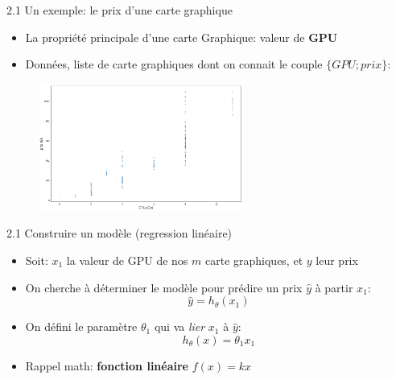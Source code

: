 \begin{frame}{2.1 Un exemple: le prix d'une carte graphique}
  \begin{itemize}
  \item La propriété principale d'une carte Graphique: valeur de \textbf{GPU}
    \vspace{0.2cm}
  \item Données, liste de carte graphiques dont on connait le couple $\{GPU;prix\}$:
  \end{itemize}

  \begin{figure}
    \includegraphics[width=0.6\textwidth]{fig/gpuPrices.png}    
  \end{figure}
\end{frame}

\begin{frame}{2.1 Construire un modèle (regression linéaire)}
  \begin{itemize}
  \item Soit: $x_{1}$ la valeur de GPU de nos $m$ carte graphiques, et $y$ leur prix
    \vspace{0.2cm}
  \item On cherche à déterminer le modèle pour prédire un prix $\hat{y}$ à partir $x_{1}$:
    \begin{equation*}
      \hat{y} = h_{\theta}(x_{1})
    \end{equation*}
  \item On défini le paramètre $\theta_{1}$ qui va \textit{lier} $x_{1}$ à $\hat{y}$:
    \begin{equation*}
      h_{\theta}(x) = \theta_{1} x_{1}
    \end{equation*}
  \item Rappel math: \textbf{fonction linéaire} $f(x) = kx$
  \end{itemize}
\end{frame}

